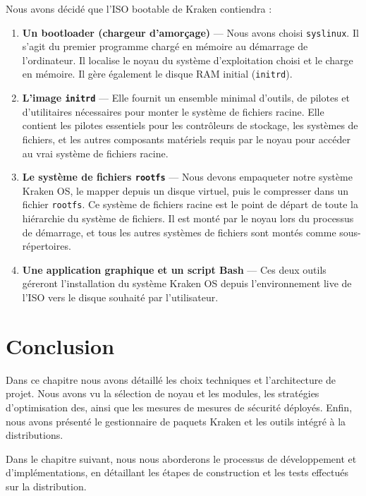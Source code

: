 Nous avons décidé que l’ISO bootable de Kraken contiendra :

\begin{enumerate}
  \item \textbf{Un bootloader (chargeur d’amorçage)} — Nous avons choisi \texttt{syslinux}. Il s’agit du premier programme chargé en mémoire au démarrage de l’ordinateur. Il localise le noyau du système d’exploitation choisi et le charge en mémoire. Il gère également le disque RAM initial (\texttt{initrd}).
  
  \item \textbf{L’image \texttt{initrd}} — Elle fournit un ensemble minimal d’outils, de pilotes et d’utilitaires nécessaires pour monter le système de fichiers racine. Elle contient les pilotes essentiels pour les contrôleurs de stockage, les systèmes de fichiers, et les autres composants matériels requis par le noyau pour accéder au vrai système de fichiers racine.
  
  \item \textbf{Le système de fichiers \texttt{rootfs}} — Nous devons empaqueter notre système Kraken OS, le mapper depuis un disque virtuel, puis le compresser dans un fichier \texttt{rootfs}. Ce système de fichiers racine est le point de départ de toute la hiérarchie du système de fichiers. Il est monté par le noyau lors du processus de démarrage, et tous les autres systèmes de fichiers sont montés comme sous-répertoires.
  
  \item \textbf{Une application graphique et un script Bash} — Ces deux outils géreront l’installation du système Kraken OS depuis l’environnement live de l’ISO vers le disque souhaité par l’utilisateur.
\end{enumerate}







\section{Conclusion}
Dans ce chapitre nous avons détaillé les choix techniques et l'architecture de projet. Nous avons vu la sélection de noyau et les modules, les stratégies d'optimisation des, ainsi que les mesures de mesures de sécurité déployés. Enfin, nous avons présenté le gestionnaire de paquets Kraken et les outils intégré à la distributions.

Dans le chapitre suivant, nous nous aborderons le processus de développement et d'implémentations, en détaillant les étapes de construction et les tests effectués sur la distribution.

\medskip



